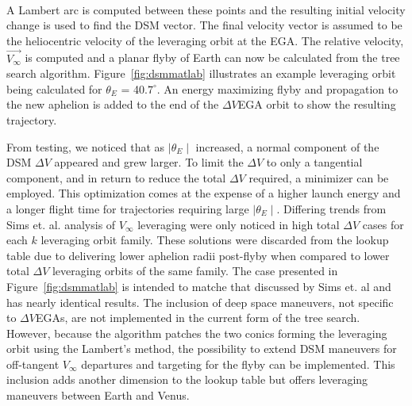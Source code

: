 \documentclass[letterpaper, paper,11pt]{./AAS}		%
\begin{document}
%
\\A Lambert arc is computed between these points and the resulting initial velocity change is used to find the DSM vector. The final velocity vector is assumed to be the heliocentric velocity of the leveraging orbit at the EGA. The relative velocity, $\vec{V_\infty}$ is computed and a planar flyby of Earth can now be calculated from the tree search algorithm. Figure~\ref{fig:dsmmatlab} illustrates an example leveraging orbit being calculated for $\theta_{E}$ = 40.$7^{\circ}$. An energy maximizing flyby and propagation to the new aphelion is added to the end of the $\Delta V$EGA orbit to show the resulting trajectory.


From testing, we noticed that as $\mid\theta_E\mid$ increased, a normal component of the DSM $\Delta V$ appeared and grew larger. To limit the $\Delta V$ to only a tangential component, and in return to reduce the total $\Delta V$ required, a minimizer can be employed. This optimization comes at the expense of a higher launch energy and a longer flight time for trajectories requiring large $\mid\theta_E\mid$. Differing trends from Sims et. al. analysis of $V_\infty$ leveraging\cite{sims1994} were only noticed in high total $\Delta V$ cases for each $k$ leveraging orbit family. These solutions were discarded from the lookup table due to delivering lower aphelion radii post-flyby when compared to lower total $\Delta V$ leveraging orbits of the same family. The case presented in Figure~\ref{fig:dsmmatlab} is intended to matche that discussed by Sims et. al\cite{Sims1997} and has nearly identical results. The inclusion of deep space maneuvers, not specific to $\Delta V$EGAs, are not implemented in the current form of the tree search. However, because the algorithm patches the two conics forming the leveraging orbit using the Lambert's method, the possibility to extend DSM maneuvers for off-tangent $V_\infty$ departures and targeting for the flyby can be implemented. This inclusion adds another dimension to the lookup table but offers leveraging maneuvers between Earth and Venus.
\end{document}
